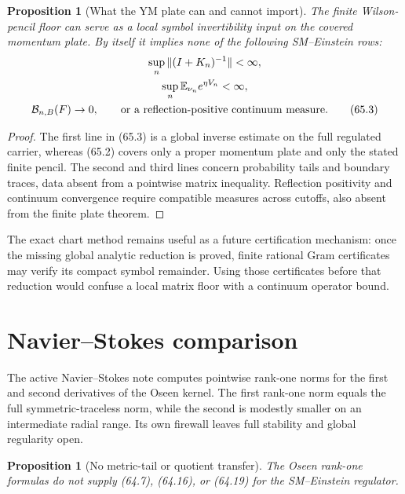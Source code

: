 \documentclass[11pt]{article}
\newtheorem{proposition}[theorem]{Proposition}
\theoremstyle{remark}
\begin{document}
\begin{proposition}[What the YM plate can and cannot import]
\label{prop:v15v65-ym-import}
The finite Wilson-pencil floor can serve as a local symbol
invertibility input on the covered momentum plate.  By itself it
implies none of the following SM--Einstein rows:
\[
\begin{gathered}
 \sup_n\|(I+K_n)^{-1}\|<\infty,\\
 \sup_n\mathbb E_{\nu_n}e^{\eta V_n}<\infty,\\
 {\cal B}_{n,B}(F)\to0,\qquad
 \hbox{or a reflection-positive continuum measure}.   \tag{65.3}
\end{gathered}
\]
\end{proposition}

\begin{proof}
The first line in (65.3) is a global inverse estimate on the full
regulated carrier, whereas (65.2) covers only a proper momentum
plate and only the stated finite pencil.  The second and third
lines concern probability tails and boundary traces, data absent
from a pointwise matrix inequality.  Reflection positivity and
continuum convergence require compatible measures across cutoffs,
also absent from the finite plate theorem.
\end{proof}

The exact chart method remains useful as a future certification
mechanism: once the missing global analytic reduction is proved,
finite rational Gram certificates may verify its compact symbol
remainder.  Using those certificates before that reduction would
confuse a local matrix floor with a continuum operator bound.

\section{Navier--Stokes comparison}

The active Navier--Stokes note computes pointwise rank-one norms for
the first and second derivatives of the Oseen kernel.  The first
rank-one norm equals the full symmetric-traceless norm, while the
second is modestly smaller on an intermediate radial range.  Its
own firewall leaves full stability and global regularity open.

\begin{proposition}[No metric-tail or quotient transfer]
\label{prop:v15v65-ns-import}
The Oseen rank-one formulas do not supply (64.7), (64.16), or
(64.19) for the SM--Einstein regulator.
\end{proposition}
\end{document}
